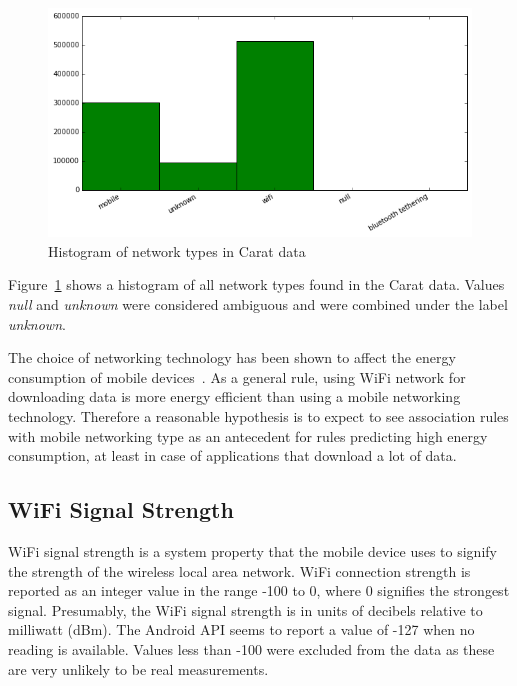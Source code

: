 \begin{figure} %
	\centering
	\includegraphics[width=\textwidth]{images/carat-data/network_type.png}
	\caption{Histogram of network types in Carat data}
	\label{figure:carat-data-net-type}
\end{figure}   

Figure~\ref{figure:carat-data-net-type} shows a histogram of all network types found in the Carat data. Values \textit{null} and \textit{unknown} were considered ambiguous and were combined under the label \textit{unknown}.
 
The choice of networking technology has been shown to affect the energy consumption of mobile devices~\cite{7146507, 6240745}. As a general rule, using WiFi network for downloading data is more energy efficient than using a mobile networking technology. Therefore a reasonable hypothesis is to expect to see association rules with mobile networking type as an antecedent for rules predicting high energy consumption, at least in case of applications that download a lot of data.  

\subsection{WiFi Signal Strength}

WiFi signal strength is a system property that the mobile device uses to signify the strength of the wireless local area network. WiFi connection strength is reported as an integer value in the range -100 to 0, where 0 signifies the strongest signal. Presumably, the WiFi signal strength is in units of decibels relative to milliwatt (dBm). The Android API seems to report a value of -127 when no reading is available. Values less than -100 were excluded from the data as these are very unlikely to be real measurements.

